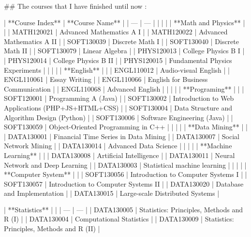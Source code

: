 

\begin{markdown}
## The courses that I have finished until now :

| **Course Index** | **Course Name** |
| --- | --- |
|   |   |
| **Math and Physics** |   |
| MATH120021 | Advanced Mathematics A I |
| MATH120022 | Advanced Mathematics A II |
| SOFT130039 | Discrete Math I |
| SOFT130040 | Discrete Math II |
| SOFT130079 | Linear Algebra |
| PHYS120013 | College Physics B I |
| PHYS120014 | College Physics B II |
| PHYS120015 | Fundamental Physics Experiments |
|   |   |
| **English** |   |
| ENGL110012 | Audio-visual English |
| ENGL110061 | Essay Writing |
| ENGL110066 | English for Business Communication |
| ENGL110068 | Advanced English |
|   |   |
| **Programing** |   |
| SOFT120001 | Programming A (Java) |
| SOFT130002 | Introduction to Web Applications (PHP+JS+HTML+CSS) |
| SOFT130004 | Data Structure and Algorithm Design (Python) |
| SOFT130006 | Software Engineering (Java) |
| SOFT130059 | Object-Oriented Programming in C++ |
|   |   |
| **Data Mining** |   |
| DATA130001 | Financial Time Series in Data Mining |
| DATA130007 | Social Network Mining |
| DATA130014 | Advanced Data Science |
|   |   |
| **Machine Learning** |   |
| DATA130008 | Artificial Intelligence |
| DATA130011 | Neural Network and Deep Learning |
| DATA130003 | Statistical machine learning |
|   |   |
| **Computer System** |   |
| SOFT130056 | Introduction to Computer Systems I |
| SOFT130057 | Introduction to Computer Systems II |
| DATA130020 | Database and Implementation |
| DATA130015 | Large-scale Distributed Systems |

| **Statistics** |   |
| --- | --- |
| DATA130005 | Statistics: Principles, Methods and R (I) |
| DATA130004 | Computational Statistics |
| DATA130009 | Statistics: Principles, Methods and R (II) |

\end{markdown}
